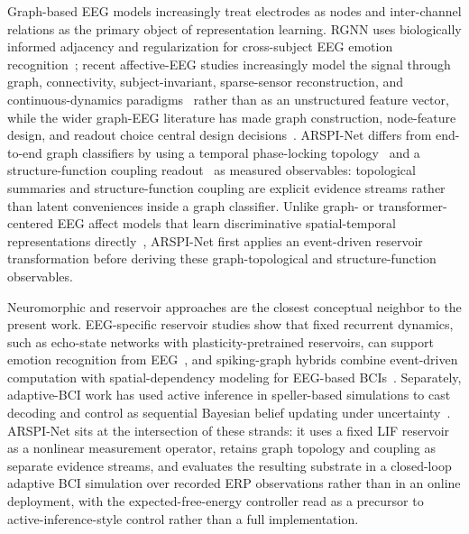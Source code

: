 \documentclass[journal]{IEEEtran}
\begin{document}
Graph-based EEG models increasingly treat electrodes as nodes and inter-channel relations as the primary object of representation learning. RGNN uses biologically informed adjacency and regularization for cross-subject EEG emotion recognition~\cite{zhong2022rgnn}; recent affective-EEG studies increasingly model the signal through graph, connectivity, subject-invariant, sparse-sensor reconstruction, and continuous-dynamics paradigms~\cite{song2023variational,chen2024gddn,shen2023contrastive,wang2022directed,xu2026f2fnet,ding2021interbrain} rather than as an unstructured feature vector, while the wider graph-EEG literature has made graph construction, node-feature design, and readout choice central design decisions~\cite{klepl2024gnn,klepl2023ad,kipf2017gcn,velickovic2018gat,battaglia2018relational}. ARSPI-Net differs from end-to-end graph classifiers by using a temporal phase-locking topology~\cite{lachaux1999plv} and a structure-function coupling readout~\cite{honey2009structural,park2013structural,suarez2020linking} as measured observables: topological summaries and structure-function coupling are explicit evidence streams rather than latent conveniences inside a graph classifier. Unlike graph- or transformer-centered EEG affect models that learn discriminative spatial-temporal representations directly~\cite{xu2024amdet}, ARSPI-Net first applies an event-driven reservoir transformation before deriving these graph-topological and structure-function observables.

Neuromorphic and reservoir approaches are the closest conceptual neighbor to the present work. EEG-specific reservoir studies show that fixed recurrent dynamics, such as echo-state networks with plasticity-pretrained reservoirs, can support emotion recognition from EEG~\cite{maass2002liquid,jaeger2001echo,lukosevicius2009reservoir,fourati2018reservoir}, and spiking-graph hybrids combine event-driven computation with spatial-dependency modeling for EEG-based BCIs~\cite{gong2023sglnet,cai2024spiking,davies2018loihi,furber2014spinnaker}. Separately, adaptive-BCI work has used active inference in speller-based simulations to cast decoding and control as sequential Bayesian belief updating under uncertainty~\cite{mladenovic2018active,rao1999predictive,friston2010free,parr2022activeinference,pezzulo2015active}. ARSPI-Net sits at the intersection of these strands: it uses a fixed LIF reservoir as a nonlinear measurement operator, retains graph topology and coupling as separate evidence streams, and evaluates the resulting substrate in a closed-loop adaptive BCI simulation over recorded ERP observations rather than in an online deployment, with the expected-free-energy controller read as a precursor to active-inference-style control rather than a full implementation.
\end{document}

